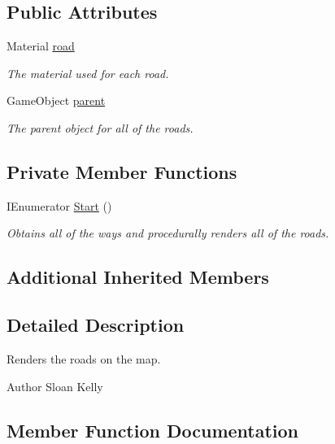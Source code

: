 \subsection*{Public Attributes}
\begin{DoxyCompactItemize}
\item 
Material \mbox{\hyperlink{class_road_maker_afb1365cbabda6f413a89d5d04434a72f}{road}}
\begin{DoxyCompactList}\small\item\em The material used for each road. \end{DoxyCompactList}\item 
Game\+Object \mbox{\hyperlink{class_road_maker_aa892946b6d1b47b0dcb7a5a68e7c48bd}{parent}}
\begin{DoxyCompactList}\small\item\em The parent object for all of the roads. \end{DoxyCompactList}\end{DoxyCompactItemize}
\subsection*{Private Member Functions}
\begin{DoxyCompactItemize}
\item 
I\+Enumerator \mbox{\hyperlink{class_road_maker_af9cdcf78901c0761e9ad0699ab457ab1}{Start}} ()
\begin{DoxyCompactList}\small\item\em Obtains all of the ways and procedurally renders all of the roads. \end{DoxyCompactList}\end{DoxyCompactItemize}
\subsection*{Additional Inherited Members}


\subsection{Detailed Description}
Renders the roads on the map. 

\begin{DoxyAuthor}{Author}
Sloan Kelly
\end{DoxyAuthor}


\subsection{Member Function Documentation}
\mbox{\label{class_road_maker_af9cdcf78901c0761e9ad0699ab457ab1}} 
